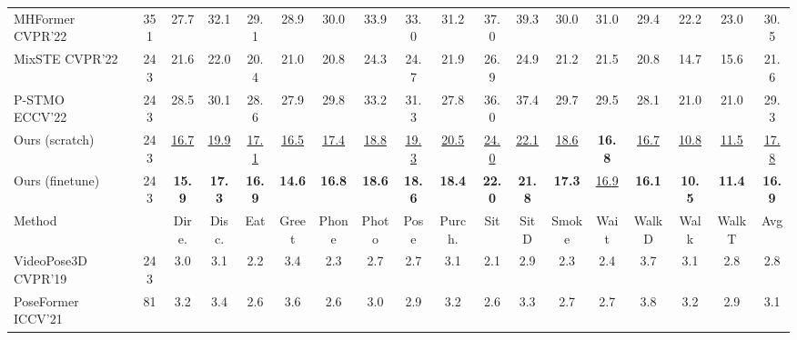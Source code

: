 \begin{table*}[t]
{\begin{tabular}{l c | c c c c c c c c c c c c c c c c}
 MHFormer \cite{li2022mhformer} CVPR'22       & 351      & 27.7          & 32.1          &  29.1   & 28.9          & 30.0          & 33.9          & 33.0   & 31.2    & 37.0    & 39.3 & 30.0          & 31.0          & 29.4          & 22.2          & 23.0         & 30.5  \\

 MixSTE \cite{zhang2022mixste}  CVPR'22    &        243    & 21.6 & 22.0 & 20.4 & 21.0 & 20.8 & 24.3 & 24.7 & 21.9 & 26.9 & 24.9          & 21.2 & 21.5 & 20.8 & 14.7 & 15.6    & 21.6      \\

  P-STMO ~\cite{shan2022p} ECCV'22        &        243    & 28.5 & 30.1 & 28.6 & 27.9  & 29.8 & 33.2 & 31.3 & 27.8 & 36.0 & 37.4 & 29.7 & 29.5 & 28.1 & 21.0 & 21.0 & 29.3      \\
\hline
\rowcolor{mygray}
 Ours (scratch)     & 243 & \underline{16.7} & \underline{19.9} & \underline{17.1} & \underline{16.5} & \underline{17.4} & \underline{18.8} & \underline{19.3} & \underline{20.5} & \underline{24.0} & \underline{22.1}          & \underline{18.6} & \textbf{16.8} & \underline{16.7} & \underline{10.8} & \underline{11.5}    & \underline{17.8}   \\


\rowcolor{mygray}
  Ours (finetune)   & 243 & \textbf{15.9} & \textbf{17.3} & \textbf{16.9} & \textbf{14.6} & \textbf{16.8} & \textbf{18.6} & \textbf{18.6} & \textbf{18.4} & \textbf{22.0} & \textbf{21.8}         & \textbf{17.3} & \underline{16.9} & \textbf{16.1} & \textbf{10.5} & \textbf{11.4}    & \textbf{16.9}      \\

\thickhline

Method &  & Dire. & Disc. & Eat & Greet & Phone & Photo & Pose & Purch. & Sit & SitD & Smoke & Wait & WalkD & Walk & WalkT & Avg \\
\hline 

VideoPose3D ~\cite{pavllo20193d} CVPR'19   & 243      & 3.0          & 3.1          & 2.2          & 3.4          & 2.3          & 2.7          & 2.7          & 3.1          & 2.1          & 2.9          & 2.3          & 2.4          & 3.7          & 3.1          & 2.8          & 2.8          \\

 PoseFormer \cite{zheng20213d} ICCV'21      & 81      & 3.2          & 3.4          & 2.6          & 3.6          & 2.6          & 3.0          & 2.9          & 3.2          & 2.6          & 3.3          & 2.7          & 2.7          & 3.8          & 3.2          & 2.9          & 3.1          \\


\end{tabular}}
\end{table*}

